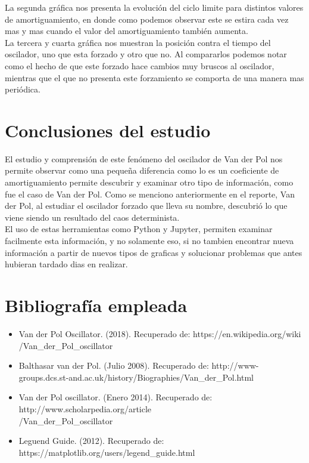 \documentclass[12pt]{article}
\begin{document}
La segunda gráfica nos presenta la evolución del ciclo limite para distintos valores de amortiguamiento, en donde como podemos observar este se estira cada vez mas y mas cuando el valor del amortiguamiento también aumenta. \\

La tercera y cuarta gráfica nos muestran la posición contra el tiempo del oscilador, uno que esta forzado y otro que no. Al compararlos podemos notar como el hecho de que este forzado hace cambios muy bruscos al oscilador, mientras que el que no presenta este forzamiento se comporta de una manera mas periódica. 

\section{Conclusiones del estudio}
El estudio y comprensión de este fenómeno del oscilador de Van der Pol nos permite observar como una pequeña diferencia como lo es un coeficiente de amortiguamiento permite descubrir y examinar otro tipo de información, como fue el caso de Van der Pol. Como se menciono anteriormente en el reporte, Van der Pol, al estudiar el oscilador forzado que lleva su nombre, descubrió lo que viene siendo un resultado del caos determinista. \\

El uso de estas herramientas como Python y Jupyter, permiten examinar facilmente esta información, y no solamente eso, si no tambien encontrar nueva información a partir de nuevos tipos de graficas y solucionar problemas que antes hubieran tardado dias en realizar. 

\section{Bibliografía empleada}
\begin{itemize}
    \item Van der Pol Oscillator. (2018). Recuperado de: https://en.wikipedia.org/wiki \\ /Van\_der\_Pol\_oscillator
    \item Balthasar van der Pol. (Julio 2008). Recuperado de: http://www-groups.dcs.st-and.ac.uk/history/Biographies/Van\_der\_Pol.html
    \item Van der Pol oscillator. (Enero 2014). Recuperado de: http://www.scholarpedia.org/article\\ /Van\_der\_Pol\_oscillator
    \item Leguend Guide. (2012). Recuperado de: https://matplotlib.org/users/legend\_guide.html
\end{itemize}
\end{document}
